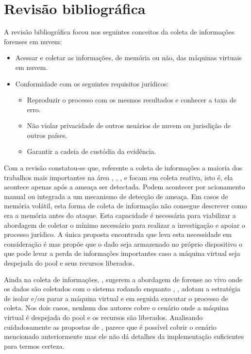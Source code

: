 \documentclass[12pt,				%
	openright,			%
	oneside,			%
	a4paper,			%
	english,			%
	brazil				%
	]{abntex2}
\begin{document}
\chapter{Revisão bibliográfica} \label{chap:related}
A revisão bibliográfica focou nos seguintes conceitos da coleta de informações forenses em nuvem:

\begin{itemize}
 \item Acessar e coletar as informações, de memória ou não, das máquinas virtuais em nuvem.
 \item Conformidade com os seguintes requisitos jurídicos: 
 \begin{itemize}
  \item Reproduzir o processo com os mesmos resultados e conhecer a taxa de erro.
  \item Não violar privacidade de outros usuários de nuvem ou jurisdição de outros países.
  \item Garantir a cadeia de custódia da evidência.
 \end{itemize}
\end{itemize}

Com a revisão constatou-se que, referente a coleta de informações a maioria dos trabalhos mais importantes na área \cite{Reichert2015}, \cite{Poisel2013}, \cite{Dykstra2013}, 
\cite{George2012} e \cite{Sang2013} focam em coleta reativa, isto é, ela acontece apenas após a ameaça ser detectada. Podem acontecer por acionamento manual ou integrada a um 
mecanismo de detecção de ameaça. Em casos de memória volátil, esta forma de coleta de informação não consegue descrever como era a memória antes do ataque. Esta capacidade é
necessária para viabilizar a abordagem de coletar o mínimo necessário para realizar a investigação e apoiar o processo jurídico. A única proposta encontrada que leva esta 
necessidade em consideração é \cite{Dezfouli2012} mas propõe que o dado seja armazenado no próprio dispositivo o que pode levar a perda de informações importantes caso a 
máquina virtual seja despejada do pool e seus recursos liberados.

Ainda na coleta de informações, \cite{Reichert2015}, \cite{George2012} sugerem a abordagem de forense ao vivo onde os dados são coletados com o sistema rodando enquanto 
\cite{Poisel2013}, \cite{Dykstra2013}, \cite{Sang2013} adotam a estratégia de isolar e/ou parar a máquina virtual e em seguida executar o processo de coleta. Nos dois casos, 
nenhum dos autores cobre o cenário onde a máquina virtual é despejada do pool e os recursos são liberados. Analisando cuidadosamente as propostas de \cite{Poisel2013}, parece que é possível
cobrir o cenário mencionado anteriormente mas ele não dá detalhes da implementação suficientes para termos certeza.
\end{document}
